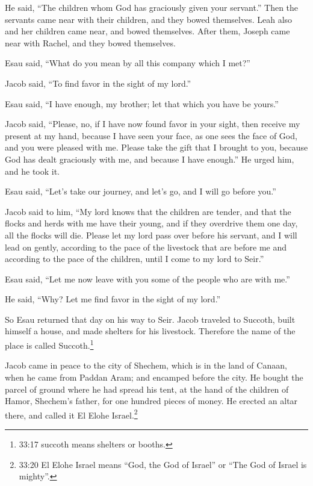 He said, “The children whom God has graciously given your servant.”   \myverse{}Then the servants came near with their children, and they bowed themselves.   \myverse{}Leah also and her children came near, and bowed themselves. After them, Joseph came near with Rachel, and they bowed themselves.

\myverse{}Esau said, “What do you mean by all this company which I met?”

Jacob said, “To find favor in the sight of my lord.”

\myverse{}Esau said, “I have enough, my brother; let that which you have be yours.”

\myverse{}Jacob said, “Please, no, if I have now found favor in your sight, then receive my present at my hand, because I have seen your face, as one sees the face of God, and you were pleased with me.    \myverse{}Please take the gift that I brought to you, because God has dealt graciously with me, and because I have enough.” He urged him, and he took it.

\myverse{}Esau said, “Let’s take our journey, and let’s go, and I will go before you.”

\myverse{}Jacob said to him, “My lord knows that the children are tender, and that the flocks and herds with me have their young, and if they overdrive them one day, all the flocks will die.   \myverse{}Please let my lord pass over before his servant, and I will lead on gently, according to the pace of the livestock that are before me and according to the pace of the children, until I come to my lord to Seir.”

\myverse{}Esau said, “Let me now leave with you some of the people who are with me.”

He said, “Why? Let me find favor in the sight of my lord.”

\myverse{}So Esau returned that day on his way to Seir. \myverse{}Jacob traveled to Succoth, built himself a house, and made shelters for his livestock. Therefore the name of the place is called Succoth.\footnote{33:17 succoth means shelters or booths.}

\myverse{}Jacob came in peace to the city of Shechem, which is in the land of Canaan, when he came from Paddan Aram; and encamped before the city. \myverse{}He bought the parcel of ground where he had spread his tent, at the hand of the children of Hamor, Shechem’s father, for one hundred pieces of money. \myverse{}He erected an altar there, and called it El Elohe Israel.\footnote{33:20 El Elohe Israel means “God, the God of Israel” or “The God of Israel is mighty”.}


